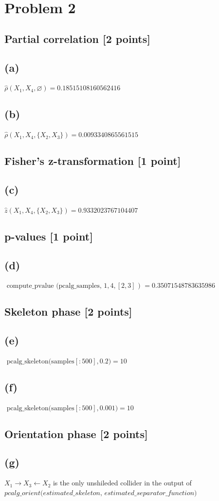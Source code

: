 \documentclass[10pt]{article}
\begin{document}
\section{Problem 2}
\subsection{Partial correlation [2 points]}
\subsection{(a)}
$\hat{\rho}\left(X_1, X_4, \varnothing\right) = 0.18515108160562416$

\subsection{(b)}
$\hat{\rho}\left(X_1, X_4, \{X_2, X_3\}\right) = 0.0093340865561515$

\subsection{Fisher’s z-transformation [1 point]}
\subsection{(c)}
$\hat{z}\left(X_1, X_4, \{X_2, X_3\}\right) = 0.9332023767104407$

\subsection{p-values [1 point]}
\subsection{(d)}
$\text { compute\_pvalue (pcalg\_samples, } 1,4,[2,3] \text { ) } = 0.35071548783635986$

\subsection{Skeleton phase [2 points]}
\subsection*{(e)}
$\text { pcalg\_skeleton(samples}[: 500], 0.2) = 10$
\subsection*{(f)}
$\text { pcalg\_skeleton(samples}[: 500], 0.001) = 10$

\subsection{Orientation phase [2 points]}
\subsection*{(g)}
$X_1 \rightarrow X_3 \leftarrow X_2$ is the only unshileded collider in the output of $\textit{pcalg\_orient(estimated\_skeleton, estimated\_separator\_function) }$ 
\end{document}
